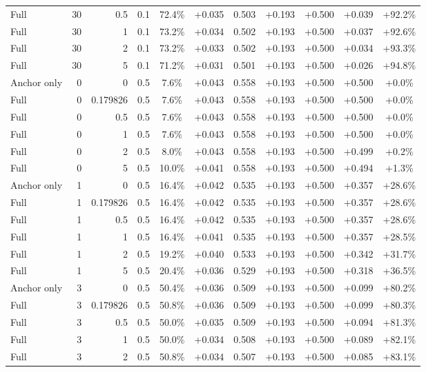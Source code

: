 \begin{table}[htbp]
\begin{tabular}{lrrrccccccc}
Full & 30 & 0.5 & 0.1 & 72.4\% & +0.035 & 0.503 & +0.193 & +0.500 & +0.039 & +92.2\% \\
Full & 30 & 1 & 0.1 & 73.2\% & +0.034 & 0.502 & +0.193 & +0.500 & +0.037 & +92.6\% \\
Full & 30 & 2 & 0.1 & 73.2\% & +0.033 & 0.502 & +0.193 & +0.500 & +0.034 & +93.3\% \\
Full & 30 & 5 & 0.1 & 71.2\% & +0.031 & 0.501 & +0.193 & +0.500 & +0.026 & +94.8\% \\
Anchor only & 0 & 0 & 0.5 & 7.6\% & +0.043 & 0.558 & +0.193 & +0.500 & +0.500 & +0.0\% \\
Full & 0 & 0.179826 & 0.5 & 7.6\% & +0.043 & 0.558 & +0.193 & +0.500 & +0.500 & +0.0\% \\
Full & 0 & 0.5 & 0.5 & 7.6\% & +0.043 & 0.558 & +0.193 & +0.500 & +0.500 & +0.0\% \\
Full & 0 & 1 & 0.5 & 7.6\% & +0.043 & 0.558 & +0.193 & +0.500 & +0.500 & +0.0\% \\
Full & 0 & 2 & 0.5 & 8.0\% & +0.043 & 0.558 & +0.193 & +0.500 & +0.499 & +0.2\% \\
Full & 0 & 5 & 0.5 & 10.0\% & +0.041 & 0.558 & +0.193 & +0.500 & +0.494 & +1.3\% \\
Anchor only & 1 & 0 & 0.5 & 16.4\% & +0.042 & 0.535 & +0.193 & +0.500 & +0.357 & +28.6\% \\
Full & 1 & 0.179826 & 0.5 & 16.4\% & +0.042 & 0.535 & +0.193 & +0.500 & +0.357 & +28.6\% \\
Full & 1 & 0.5 & 0.5 & 16.4\% & +0.042 & 0.535 & +0.193 & +0.500 & +0.357 & +28.6\% \\
Full & 1 & 1 & 0.5 & 16.4\% & +0.041 & 0.535 & +0.193 & +0.500 & +0.357 & +28.5\% \\
Full & 1 & 2 & 0.5 & 19.2\% & +0.040 & 0.533 & +0.193 & +0.500 & +0.342 & +31.7\% \\
Full & 1 & 5 & 0.5 & 20.4\% & +0.036 & 0.529 & +0.193 & +0.500 & +0.318 & +36.5\% \\
Anchor only & 3 & 0 & 0.5 & 50.4\% & +0.036 & 0.509 & +0.193 & +0.500 & +0.099 & +80.2\% \\
Full & 3 & 0.179826 & 0.5 & 50.8\% & +0.036 & 0.509 & +0.193 & +0.500 & +0.099 & +80.3\% \\
Full & 3 & 0.5 & 0.5 & 50.0\% & +0.035 & 0.509 & +0.193 & +0.500 & +0.094 & +81.3\% \\
Full & 3 & 1 & 0.5 & 50.0\% & +0.034 & 0.508 & +0.193 & +0.500 & +0.089 & +82.1\% \\
Full & 3 & 2 & 0.5 & 50.8\% & +0.034 & 0.507 & +0.193 & +0.500 & +0.085 & +83.1\% \\

\end{tabular}
\end{table}
